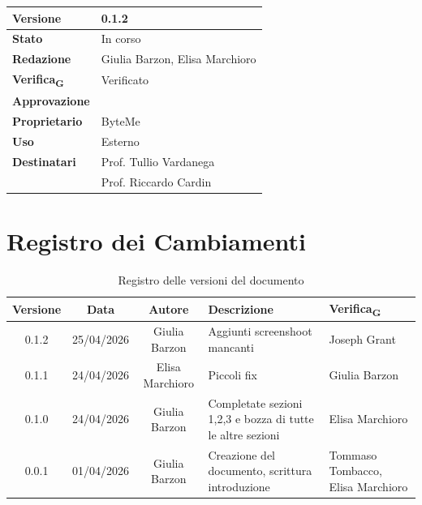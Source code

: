 \documentclass[11pt,a4paper]{article}
\newcommand{\gls}[1]{#1\textsubscript{G}}
\begin{document}
\begin{titlepage}
    \begin{table}[H]
        \centering
        \begin{tabular}{|l|p{5cm}|}
            \hline
            \textbf{Versione} & 0.1.2 \\
            \hline
            \textbf{Stato} & In corso\\
            \hline
            \textbf{Redazione} & Giulia Barzon, Elisa Marchioro\\
            \hline
            \textbf{\gls{Verifica}} & Verificato \\
            \hline
            \textbf{Approvazione} & \\
            \hline
            \textbf{Proprietario} & ByteMe \\
            \hline
            \textbf{Uso} & Esterno \\
            \hline
            \textbf{Destinatari} & Prof. Tullio Vardanega \\ & Prof. Riccardo Cardin \\
            \hline
        \end{tabular}
    \end{table}
    
    \vfill
\end{titlepage}

\thispagestyle{empty}
\section*{Registro dei Cambiamenti}

\begin{table}[H]
    \centering
    \begin{tabular}{|c|c|c|>{\raggedright\arraybackslash}p{}|p{}|}
        \hline
        \textbf{Versione} & \textbf{Data} & \textbf{Autore} & \textbf{Descrizione} & \textbf{\gls{Verifica}} \\
        \hline
        0.1.2 & 25/04/2026 & Giulia Barzon & Aggiunti screenshoot mancanti & Joseph Grant \\
        \hline
        0.1.1 & 24/04/2026 & Elisa Marchioro & Piccoli fix & Giulia Barzon\\
        \hline
        0.1.0 & 24/04/2026 & Giulia Barzon & Completate sezioni 1,2,3 e bozza di tutte le altre sezioni & Elisa Marchioro\\
        \hline
        0.0.1 & 01/04/2026 & Giulia Barzon & Creazione del documento, scrittura introduzione & Tommaso Tombacco, Elisa Marchioro \\
        \hline
    \end{tabular}
    \caption{Registro delle versioni del documento}
    \label{tab:versionamento}
\end{table}
\end{document}
